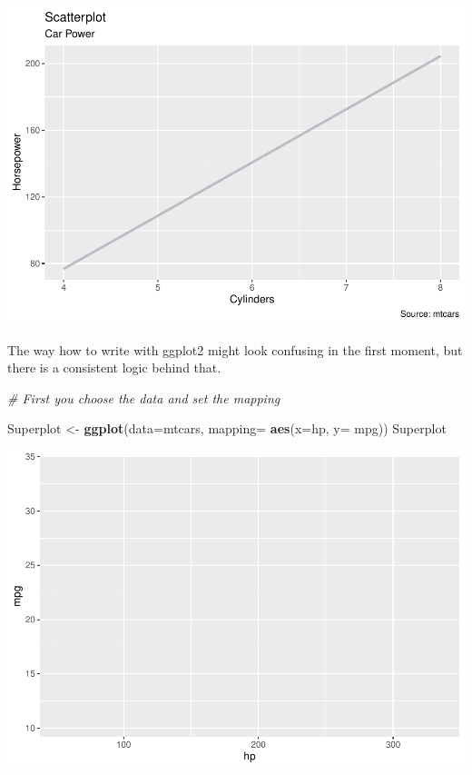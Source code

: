 \documentclass[]{report}
\newenvironment{Shaded}{\begin{snugshade}}{\end{snugshade}}
\newcommand{\KeywordTok}[1]{\textcolor[rgb]{0.13,0.29,0.53}{\textbf{#1}}}
\newcommand{\DataTypeTok}[1]{\textcolor[rgb]{0.13,0.29,0.53}{#1}}
\newcommand{\StringTok}[1]{\textcolor[rgb]{0.31,0.60,0.02}{#1}}
\newcommand{\CommentTok}[1]{\textcolor[rgb]{0.56,0.35,0.01}{\textit{#1}}}
\newcommand{\NormalTok}[1]{#1}
\begin{document}
\includegraphics{MyBook_files/figure-latex/unnamed-chunk-68-1.pdf}

The way how to write with ggplot2 might look confusing in the first
moment, but there is a consistent logic behind that.

\begin{Shaded}
\begin{Highlighting}[]
\CommentTok{# First you choose the data and set the mapping}

\NormalTok{Superplot <-}\StringTok{ }\KeywordTok{ggplot}\NormalTok{(}\DataTypeTok{data=}\NormalTok{mtcars, }\DataTypeTok{mapping=} \KeywordTok{aes}\NormalTok{(}\DataTypeTok{x=}\NormalTok{hp, }\DataTypeTok{y=}\NormalTok{ mpg))}
\NormalTok{Superplot}
\end{Highlighting}
\end{Shaded}

\includegraphics{MyBook_files/figure-latex/unnamed-chunk-69-1.pdf}
\end{document}
